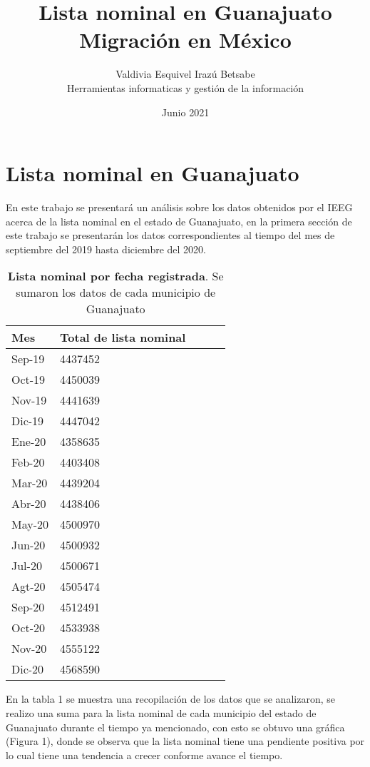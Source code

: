 \documentclass{article}
\title{\textbf{Lista nominal en Guanajuato\\Migración en México}}
\author{Valdivia Esquivel Irazú Betsabe\\Herramientas informaticas y gestión de la información }
\date{Junio 2021}
\begin{document}
\maketitle
\newpage
\section{Lista nominal en Guanajuato}
En este trabajo se presentará un análisis sobre los datos obtenidos por el IEEG acerca de la lista nominal en el estado de Guanajuato, en la primera sección de este trabajo se presentarán los datos correspondientes al tiempo del mes de septiembre del 2019 hasta diciembre del 2020.

\begin{table}[htb!]\centering
\begin{tabular}{|l|l|l|l|l|}
\hline
Mes & Total de lista nominal \\ \hline
Sep-19 & 4437452 \\ \hline
Oct-19 & 4450039 \\ \hline
Nov-19 & 4441639\\ \hline
Dic-19 & 4447042 \\ \hline
Ene-20 & 4358635\\ \hline
Feb-20 & 4403408\\ \hline
Mar-20 & 4439204 \\ \hline
Abr-20 & 4438406 \\ \hline
May-20 & 4500970 \\ \hline
Jun-20 & 4500932 \\ \hline
Jul-20 & 4500671\\ \hline
Agt-20 & 4505474 \\ \hline
Sep-20 & 4512491\\ \hline
Oct-20 & 4533938\\ \hline
Nov-20 & 4555122 \\ \hline
Dic-20 & 4568590 \\ \hline
\end{tabular}
\caption{\textbf{Lista nominal por fecha registrada}. Se sumaron los datos de cada municipio de Guanajuato}
\label{table:V1}
\end{table}
 En la tabla 1 se muestra una recopilación de los datos que se analizaron, se realizo una suma para la lista nominal de cada municipio del estado de Guanajuato durante el tiempo ya mencionado, con esto se obtuvo una gráfica (Figura 1), donde se observa que la lista nominal tiene una pendiente positiva por lo cual tiene una tendencia a crecer conforme avance el tiempo.\\
 
\end{document}
